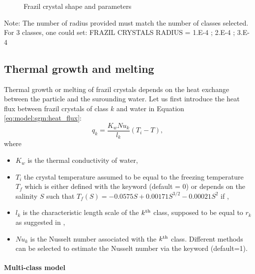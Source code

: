 \begin{figure}[H]
    \begin{center}
    \end{center}
    \caption{Frazil crystal shape and parameters}
    \label{fig:crystal_shape}
\end{figure}

\begin{WarningBlock}{Note:}
 The number of radius provided must match the number of classes selected. For 3 classes, one could set:
 FRAZIL CRYSTALS RADIUS = 1.E-4 ; 2.E-4 ; 3.E-4
\end{WarningBlock}

\subsection{Thermal growth and melting}
\label{section:thermal_growth}

Thermal growth or melting of frazil crystals depends on the heat exchange between the particle and the surounding water.
Let us first introduce the heat flux between frazil crystals of class $k$ and water in Equation \eqref{eq:model:sgm:heat_flux}:
\begin{equation}
q_k = \dfrac{K_w Nu_k}{l_k} (T_i - T),
\label{eq:model:sgm:heat_flux}
\end{equation}
where
\begin{itemize}
	\item $K_w$ is the thermal conductivity of water,
	\item $T_i$ the crystal temperature assumed to be equal to the freezing temperature $T_f$ which
is either defined with the keyword  (default = 0) or
depends on the salinity $S$ such that $T_f(S) = -0.0575S + 0.00171S^{3/2} - 0.00021S^2$ if ,
    \item $l_k$ is the characteristic length scale of the $k^{\rm{th}}$ class, supposed to be equal to $r_k$ as suggested in \cite{holland_JFM_2005, holland_2006},
    \item $Nu_k$ is the Nusselt number associated with the $k^{\rm{th}}$ class. Different methods can be selected to estimate the Nusselt number via the keyword  (default=1).
\end{itemize}


\paragraph{Multi-class model}

